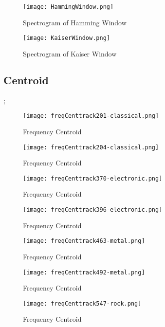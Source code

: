 \documentclass{article} %
\begin{document}
\begin{figure}[H]
\centering
\texttt{[image: HammingWindow.png]}
\caption{Spectrogram of Hamming Window}
\label{fig:hamWindows}
\end{figure}

\begin{figure}[H]
\centering
\texttt{[image: KaiserWindow.png]}
\caption{Spectrogram of Kaiser Window}
\label{fig:kaiserWindows}
\end{figure}

\clearpage
\subsection{Centroid}
\label{sec:centroid};

\begin{figure}[H]
\centering
\texttt{[image: freqCenttrack201-classical.png]}
\caption{Frequency Centroid}
\label{fig:centr201}
\end{figure}

\begin{figure}[H]
\centering
\texttt{[image: freqCenttrack204-classical.png]}
\caption{Frequency Centroid}
\label{fig:centr204}
\end{figure}

\begin{figure}[H]
\centering
\texttt{[image: freqCenttrack370-electronic.png]}
\caption{Frequency Centroid}
\label{fig:cent370}
\end{figure}


\begin{figure}[H]
\centering
\texttt{[image: freqCenttrack396-electronic.png]}
\caption{Frequency Centroid}
\label{fig:cent396}
\end{figure}


\begin{figure}[H]
\centering
\texttt{[image: freqCenttrack463-metal.png]}
\caption{Frequency Centroid}
\label{fig:cent463}
\end{figure}


\begin{figure}[H]
\centering
\texttt{[image: freqCenttrack492-metal.png]}
\caption{Frequency Centroid}
\label{fig:cent492}
\end{figure}


\begin{figure}[H]
\centering
\texttt{[image: freqCenttrack547-rock.png]}
\caption{Frequency Centroid}
\label{fig:cent547}
\end{figure}
\end{document}
